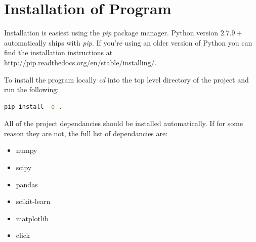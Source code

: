 \documentclass[journal]{IEEEtran}
\begin{document}

%


\appendices
\clearpage

\section{Installation of Program}
\label{appendix:installation}
Installation is easiest using the \textit{pip} package manager. Python version $2.7.9+$ automatically ships with \textit{pip}. If you're using an older version of Python you can find the installation instructions at http://pip.readthedocs.org/en/stable/installing/.

To install the program locally \textit{cd} into the top level directory of the project and run the following:

\begin{lstlisting}[language=Bash]
pip install -e .	
\end{lstlisting}


All of the project dependancies should be installed automatically. If for some reason they are not, the full list of dependancies are:

\begin{itemize}
	\item numpy
	\item scipy
	\item pandas
	\item scikit-learn
	\item matplotlib
	\item click
\end{itemize}
\end{document}
